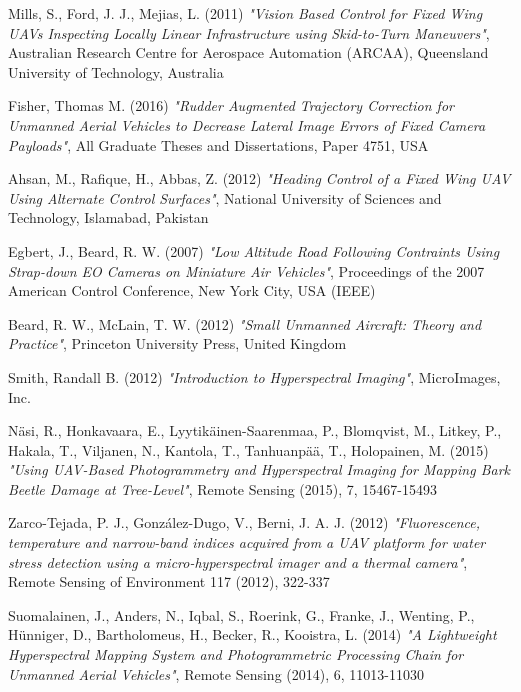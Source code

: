 \begin{thebibliography}{25}
	Mills, S., Ford, J. J., Mejias, L. (2011)
	\emph{"Vision Based Control for Fixed Wing UAVs Inspecting Locally Linear Infrastructure using Skid-to-Turn Maneuvers"}, 
	Australian Research Centre for Aerospace Automation (ARCAA), Queensland University of Technology, Australia
	
	Fisher, Thomas M. (2016)
	\emph{"Rudder Augmented Trajectory Correction for Unmanned Aerial Vehicles to Decrease Lateral Image Errors of Fixed Camera Payloads"},
	All Graduate Theses and Dissertations, Paper 4751, USA
	
	Ahsan, M., Rafique, H., Abbas, Z. (2012)
	\emph{"Heading Control of a Fixed Wing UAV Using Alternate Control Surfaces"},
	National University of Sciences and Technology, Islamabad, Pakistan
	
	Egbert, J., Beard, R. W. (2007)
	\emph{"Low Altitude Road Following Contraints Using Strap-down EO Cameras on Miniature Air Vehicles"},
	Proceedings of the 2007 American Control Conference, New York City, USA (IEEE)
	
	Beard, R. W., McLain, T. W. (2012)
	\emph{"Small Unmanned Aircraft: Theory and Practice"},
	Princeton University Press, United Kingdom
	
	Smith, Randall B. (2012)
	\emph{"Introduction to Hyperspectral Imaging"},
	MicroImages, Inc.
	
	Näsi, R., Honkavaara, E., Lyytikäinen-Saarenmaa, P., Blomqvist, M., Litkey, P., Hakala, T., Viljanen, N., Kantola, T., Tanhuanpää, T., Holopainen, M. (2015)
	\emph{"Using UAV-Based Photogrammetry and Hyperspectral Imaging for Mapping Bark Beetle Damage at Tree-Level"},
	Remote Sensing (2015), 7, 15467-15493
	
	Zarco-Tejada, P. J., González-Dugo, V., Berni, J. A. J. (2012)
	\emph{"Fluorescence, temperature and narrow-band indices acquired from a UAV platform for water stress detection using a micro-hyperspectral imager and a thermal camera"},
	Remote Sensing of Environment 117 (2012), 322-337
	
	Suomalainen, J., Anders, N., Iqbal, S., Roerink, G., Franke, J., Wenting, P., Hünniger, D., Bartholomeus, H., Becker, R., Kooistra, L. (2014)
	\emph{"A Lightweight Hyperspectral Mapping System and Photogrammetric Processing Chain for Unmanned Aerial Vehicles"},
	Remote Sensing (2014), 6, 11013-11030
	
\end{thebibliography}
